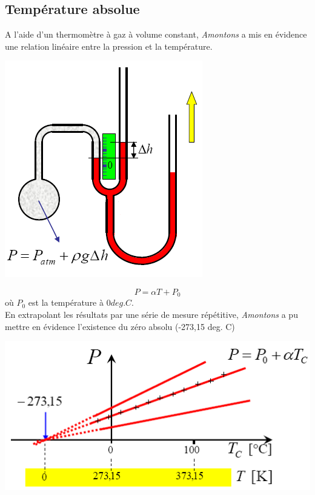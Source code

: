 \documentclass	[11pt, a4paper, openany]{book}
\begin{document}
\subsection{Température absolue}
A l'aide d'un thermomètre à gaz à volume constant, \textit{Amontons} a mis en évidence une relation linéaire entre la pression et la température.
\begin{center}
\includegraphics[scale=0.15]{th/image3.png}
\end{center}
\begin{equation}
P = \alpha T + P_0
\end{equation}
où $P_0$ est la température à $0 deg. C$.\\
En extrapolant les résultats par une série de mesure répétitive, \textit{Amontons} a pu mettre en évidence l'existence du zéro absolu (-273,15 deg. C)
\begin{center}
\includegraphics[scale=0.3]{th/image4.png}
\end{center}
\end{document}
